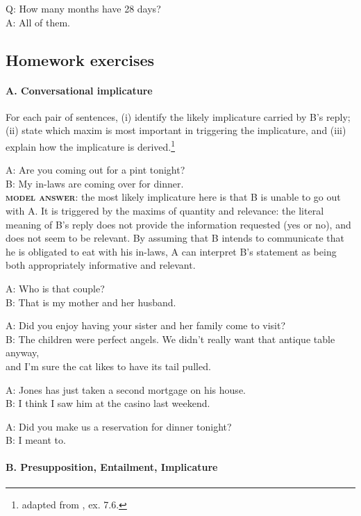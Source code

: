 \ea%
    \label{ex:key:6}
Q: How many months have 28 days? \\
A: All of them.    
\z

\subsection*{Homework exercises}
\paragraph*{A. Conversational implicature}

For each pair of sentences, (i) identify the likely implicature carried by B’s reply; (ii) state which maxim is most important in triggering the implicature, and (iii) explain how the implicature is derived.\footnote{adapted from \citet[226]{Saeed2009}, ex. 7.6.}

\ea
\ea  A: Are you coming out for a pint tonight?\\
  B: My in-laws are coming over for dinner.\\
\textsf{\textbf{\textsc{model answer}}}\textsf{: the most likely implicature here is that B is unable to go out with A. It is triggered by the maxims of quantity and relevance: the literal meaning of B’s reply does not provide the information requested (yes or no), and does not seem to be relevant. By assuming that B intends to communicate that he is obligated to eat with his in-laws, A can interpret B’s statement as being both appropriately informative and relevant.}

\ex  A: Who is that couple?\\
  B: That is my mother and her husband.

\ex  A: Did you enjoy having your sister and her family come to visit?\\
  B: The children were perfect angels. We didn’t really want that antique table anyway,\\
    and I’m sure the cat likes to have its tail pulled.

\ex  A: Jones has just taken a second mortgage on his house.\\
  B: I think I saw him at the casino last weekend.

\ex  A: Did you make us a reservation for dinner tonight?\\
  B: I meant to.
\z
\z

\paragraph*{B. Presupposition, Entailment, Implicature\footnotemark{}}

